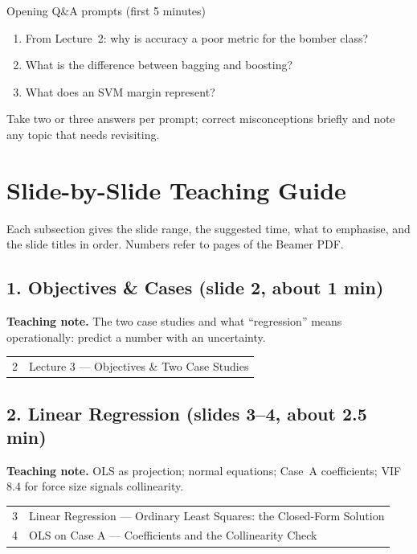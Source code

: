 \documentclass[11pt]{article}
\begin{document}
\begin{instr}{Opening Q\&A prompts (first 5 minutes)}\begin{enumerate}\item From Lecture~2: why is accuracy a poor metric for the bomber class?\item What is the difference between bagging and boosting?\item What does an SVM margin represent?\end{enumerate}Take two or three answers per prompt; correct misconceptions briefly and note any topic that needs revisiting.\end{instr}

\section{Slide-by-Slide Teaching Guide}

Each subsection gives the slide range, the suggested time, what to emphasise, and the slide titles in order. Numbers refer to pages of the Beamer PDF.

\subsection{1. Objectives \& Cases \normalfont\small\color{GreyN}(slide 2, about 1 min)}

\textbf{Teaching note.} The two case studies and what ``regression'' means operationally: predict a number with an uncertainty.

\begin{center}\small\renewcommand{\arraystretch}{1.1}\begin{tabularx}{\textwidth}{@{}r X@{}}2 & Lecture 3 --- Objectives \& Two Case Studies\\\end{tabularx}\end{center}

\subsection{2. Linear Regression \normalfont\small\color{GreyN}(slides 3--4, about 2.5 min)}

\textbf{Teaching note.} OLS as projection; normal equations; Case~A coefficients; VIF 8.4 for force size signals collinearity.

\begin{center}\small\renewcommand{\arraystretch}{1.1}\begin{tabularx}{\textwidth}{@{}r X@{}}3 & Linear Regression --- Ordinary Least Squares: the Closed-Form Solution\\
4 & OLS on Case A --- Coefficients and the Collinearity Check\\\end{tabularx}\end{center}
\end{document}
